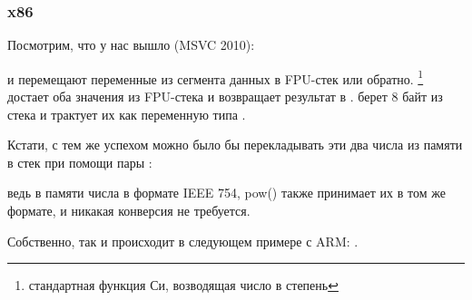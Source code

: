 \subsubsection{x86}

Посмотрим, что у нас вышло (MSVC 2010):



\FLD и \FSTP перемещают переменные из сегмента данных в FPU-стек или обратно. 
\footnote{стандартная функция Си, возводящая число в степень} достает оба значения из FPU-стека и 
возвращает результат в . 
\printf берет 8 байт из стека и трактует их как переменную типа \Tdouble.

Кстати, с тем же успехом можно было бы перекладывать эти два числа из памяти в стек при помощи пары \MOV:
 
ведь в памяти числа в формате IEEE 754, pow() также принимает их в том же
формате, и никакая конверсия не требуется.

Собственно, так и происходит в следующем примере с ARM: .

